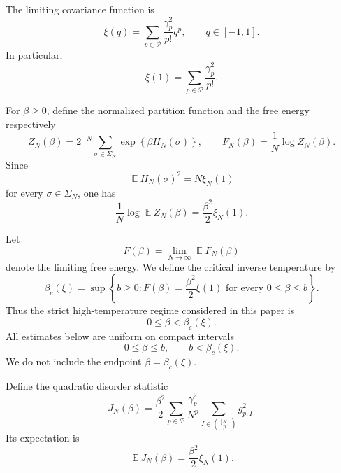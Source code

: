 \documentclass[letterpaper,11pt,reqno]{amsart}
\renewcommand{\leq}{\leqslant}
\renewcommand{\geq}{\geqslant}
\newcommand{\cP}{\mathcal{P}}\newcommand{\cQ}{\mathcal{Q}}\newcommand{\cR}{\mathcal{R}}
\DeclareMathOperator{\E}{\mathds{E}}
\begin{document}
The limiting covariance function is
\begin{equation}
\xi(q)
=
\sum_{p\in\cP}
\frac{\gamma_p^2}{p!}q^p,
\qquad
q\in[-1,1].
\label{eq:xi}
\end{equation}
In particular,
\begin{equation}
\xi(1)
=
\sum_{p\in\cP}
\frac{\gamma_p^2}{p!}.
\label{eq:xi-one}
\end{equation}

For $\beta\geq 0$, define the normalized partition function and the
free energy respectively
\begin{equation}
Z_N(\beta)
=
2^{-N}
\sum_{\sigma\in\Sigma_N}
\exp\left\{
\beta H_N(\sigma)
\right\},
\qquad
F_N(\beta)
=
\frac1N\log Z_N(\beta).
\label{eq:partition-free-energy}
\end{equation}
Since
\[
\E H_N(\sigma)^2=N\xi_N(1)
\]
for every $\sigma\in\Sigma_N$, one has
\begin{equation}
\frac1N\log\E Z_N(\beta)
=
\frac{\beta^2}{2}\xi_N(1).
\label{eq:annealed-free-energy}
\end{equation}

Let
\begin{equation}
F(\beta)
=
\lim_{N\to\infty}\E F_N(\beta)
\label{eq:limiting-free-energy}
\end{equation}
denote the limiting free energy.  We define the critical inverse
temperature by
\begin{equation}
\beta_c(\xi)
=
\sup\left\{
b\geq 0:
F(\beta)
=
\frac{\beta^2}{2}\xi(1)
\text{ for every }0\leq\beta\leq b
\right\}.
\label{eq:critical-inverse-temperature}
\end{equation}
Thus the strict high-temperature regime considered in this paper is
\begin{equation}
0\leq\beta<\beta_c(\xi).
\label{eq:high-temperature-regime}
\end{equation}
All estimates below are uniform on compact intervals
\begin{equation}
0\leq\beta\leq b,
\qquad
b<\beta_c(\xi).
\label{eq:compact-high-temperature-interval}
\end{equation}
We do not include the endpoint $\beta=\beta_c(\xi)$.

Define the quadratic disorder statistic
\begin{equation}
J_N(\beta)
=
\frac{\beta^2}{2}
\sum_{p\in\cP}
\frac{\gamma_p^2}{N^p}
\sum_{I\in\binom{[N]}p}
g_{p,I}^2.
\label{eq:J-N}
\end{equation}
Its expectation is
\begin{equation}
\E J_N(\beta)
=
\frac{\beta^2}{2}\xi_N(1).
\label{eq:mean-J-N}
\end{equation}
\end{document}
